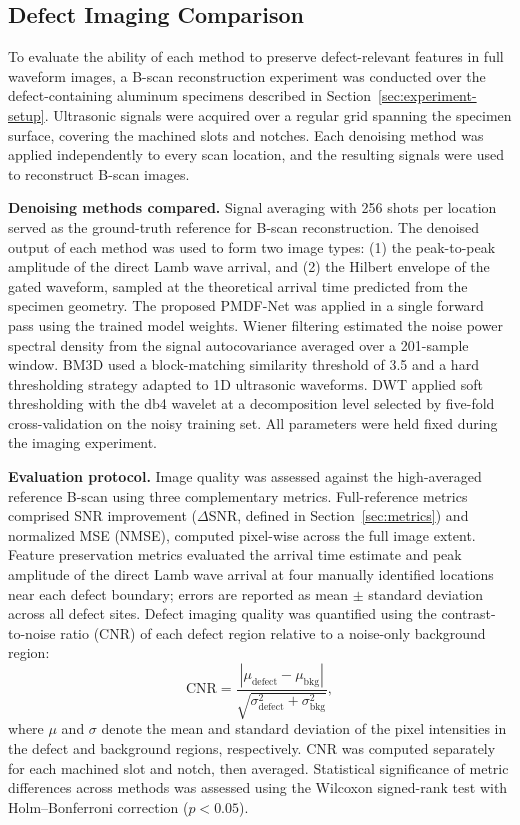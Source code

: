\subsection{Defect Imaging Comparison}
\label{sec:experiment-imaging}

To evaluate the ability of each method to preserve defect-relevant features in full waveform images, a B-scan reconstruction experiment was conducted over the defect-containing aluminum specimens described in Section~\ref{sec:experiment-setup}. Ultrasonic signals were acquired over a regular grid spanning the specimen surface, covering the machined slots and notches. Each denoising method was applied independently to every scan location, and the resulting signals were used to reconstruct B-scan images.

\textbf{Denoising methods compared.} Signal averaging with 256 shots per location served as the ground-truth reference for B-scan reconstruction. The denoised output of each method was used to form two image types: (1) the peak-to-peak amplitude of the direct Lamb wave arrival, and (2) the Hilbert envelope of the gated waveform, sampled at the theoretical arrival time predicted from the specimen geometry. The proposed PMDF-Net was applied in a single forward pass using the trained model weights. Wiener filtering estimated the noise power spectral density from the signal autocovariance averaged over a 201-sample window. BM3D used a block-matching similarity threshold of 3.5 and a hard thresholding strategy adapted to 1D ultrasonic waveforms. DWT applied soft thresholding with the db4 wavelet at a decomposition level selected by five-fold cross-validation on the noisy training set. All parameters were held fixed during the imaging experiment.

\textbf{Evaluation protocol.} Image quality was assessed against the high-averaged reference B-scan using three complementary metrics. Full-reference metrics comprised SNR improvement ($\Delta$SNR, defined in Section~\ref{sec:metrics}) and normalized MSE (NMSE), computed pixel-wise across the full image extent. Feature preservation metrics evaluated the arrival time estimate and peak amplitude of the direct Lamb wave arrival at four manually identified locations near each defect boundary; errors are reported as mean $\pm$ standard deviation across all defect sites. Defect imaging quality was quantified using the contrast-to-noise ratio (CNR) of each defect region relative to a noise-only background region:
\begin{equation}
\text{CNR} = \frac{|\mu_{\text{defect}} - \mu_{\text{bkg}}|}{\sqrt{\sigma_{\text{defect}}^2 + \sigma_{\text{bkg}}^2}},
\end{equation}
where $\mu$ and $\sigma$ denote the mean and standard deviation of the pixel intensities in the defect and background regions, respectively. CNR was computed separately for each machined slot and notch, then averaged. Statistical significance of metric differences across methods was assessed using the Wilcoxon signed-rank test with Holm--Bonferroni correction ($p < 0.05$).
